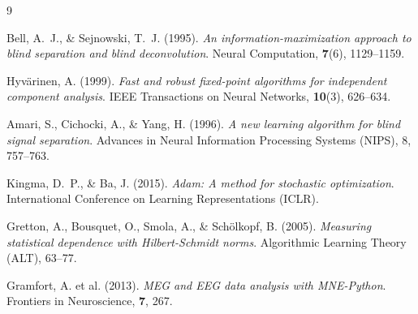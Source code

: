 \documentclass[12pt, a4paper]{article}
\begin{document}
\begin{thebibliography}{9}

Bell, A.~J., \& Sejnowski, T.~J. (1995).
\textit{An information-maximization approach to blind separation and blind deconvolution}.
Neural Computation, \textbf{7}(6), 1129--1159.

Hyvärinen, A. (1999).
\textit{Fast and robust fixed-point algorithms for independent component analysis}.
IEEE Transactions on Neural Networks, \textbf{10}(3), 626--634.

Amari, S., Cichocki, A., \& Yang, H. (1996).
\textit{A new learning algorithm for blind signal separation}.
Advances in Neural Information Processing Systems (NIPS), 8, 757--763.

Kingma, D.~P., \& Ba, J. (2015).
\textit{Adam: A method for stochastic optimization}.
International Conference on Learning Representations (ICLR).

Gretton, A., Bousquet, O., Smola, A., \& Schölkopf, B. (2005).
\textit{Measuring statistical dependence with Hilbert-Schmidt norms}.
Algorithmic Learning Theory (ALT), 63--77.

Gramfort, A. et al. (2013).
\textit{MEG and EEG data analysis with MNE-Python}.
Frontiers in Neuroscience, \textbf{7}, 267.

\end{thebibliography}
\end{document}
